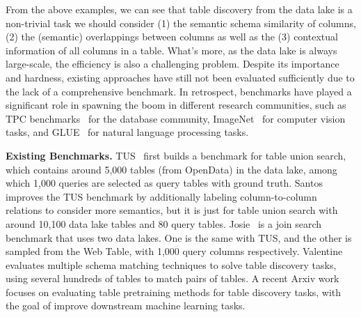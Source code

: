 From the above examples, we can see that table discovery from the data lake is a non-trivial task we should consider (1) the semantic schema similarity of columns, (2) the (semantic) overlappings between columns as well as the (3) contextual information of all columns in a table.
What's more, as the data lake is always large-scale, the efficiency is also a challenging problem. Despite its importance and hardness, existing approaches have still not been evaluated  sufficiently due to the lack of a comprehensive benchmark.  In retrospect, benchmarks have played a significant role
in spawning the boom in different research communities, such as
TPC benchmarks~\cc{\cite{}} for the database community, ImageNet~\cc{\cite{}} for computer vision tasks, and GLUE~\cc{\cite{}} for natural language processing tasks.







\noindent \textbf{Existing Benchmarks.}  
TUS~\cite{TUS} first builds a benchmark for table union search, which contains around 5,000 tables (from OpenData) in the data lake, among which 1,000 queries are selected as query tables with ground truth. 
Santos~\cite{Santos} improves the TUS benchmark by additionally labeling column-to-column relations to consider more semantics, but it is just for table union search with around 10,100 data lake tables and 80 query tables.
Josie~\cite{Josie} is a join search benchmark that uses two data lakes. One is the same with TUS, and the other is sampled from the Web Table, with 1,000 query columns respectively. 
Valentine~\cite{valentine} evaluates multiple schema matching techniques to solve table discovery tasks, using several hundreds of tables to match pairs of tables. A recent Arxiv work~\cite{arxiv} focuses on evaluating table pretraining methods for table discovery tasks, with the goal of improve downstream machine learning tasks. 

